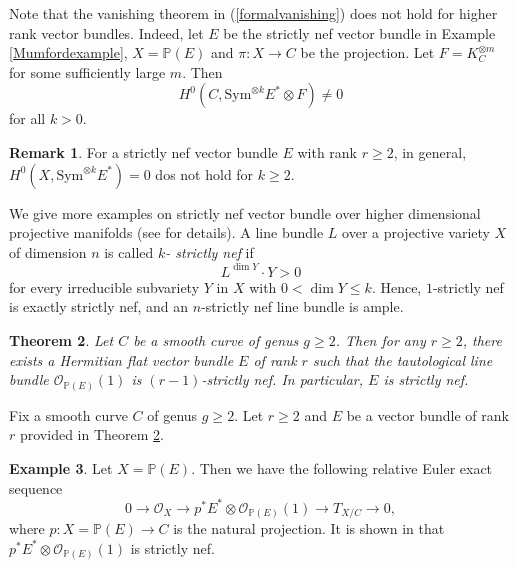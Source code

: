 \documentclass[english,reqno]{amsart}
\newcommand\bbP{{\mathbb P}}
\newcommand\sO{{\mathscr O}}
\theoremstyle{plain}
\newtheorem{thm}{Theorem}[section]
\theoremstyle{definition}
\newtheorem{example}[thm]{Example}
\newtheorem{remark}[thm]{Remark}
\numberwithin{equation}{section} %
\begin{document}
\noindent Note that the  vanishing theorem in (\ref{formalvanishing}) does not hold for higher rank vector bundles. Indeed, let $E$ be the strictly nef vector bundle in Example \ref{Mumfordexample}, $X=\bbP(E)$ and $\pi:X\rightarrow C$ be the projection. Let $ F=K^{\otimes m}_C$ for some sufficiently large $m$. Then
$$H^0(C, \mathrm{Sym}^{\otimes k}E^*\otimes F)\neq 0$$
for all $k>0$.

\begin{remark} For a strictly nef vector bundle $E$ with rank $r\geqslant  2$, in general,  $H^0(X,\mathrm{Sym}^{\otimes k} E^*)=0$ dos not hold for $k\geqslant  2$.

\end{remark}



We give more examples on strictly nef vector bundle over higher
dimensional projective manifolds (see
\cite[Section~5]{LiuOuYang2020} for details). A line bundle $L$ over
a projective variety $X$ of dimension $n$ is called \emph{$k$-
strictly nef} if
$$L^{\dim Y}\cdot Y>0$$
for every irreducible subvariety $Y$ in $X$ with $0<\dim Y\leq k$.
Hence, $1$-strictly nef is exactly strictly nef, and an $n$-strictly
nef line bundle is ample.
\begin{thm}\cite[Lemma 3.2 and Theorem 6.1]{Subramanian1989}\label{Subramanian}
    Let $C$ be a smooth curve of genus $g\geqslant 2$. Then for any $r\geqslant 2$, there exists a Hermitian flat vector bundle $E$ of rank $r$ such that the tautological line bundle $\sO_{\bbP(E)}(1)$ is $(r-1)$-strictly nef. In particular, $E$ is strictly nef.
\end{thm}

\noindent  Fix  a smooth  curve $C$ of genus $g \geqslant 2$. Let  $r\geqslant 2$ and  $E$  be a vector bundle of rank $r$ provided in Theorem \ref{Subramanian}.

\begin{example}
    \label{example:subbundles}
    Let $X=\bbP(E)$. Then we have the following relative Euler exact sequence
    \[0\rightarrow \sO_X\rightarrow p^*E^*\otimes\sO_{\bbP(E)}(1)\rightarrow T_{X/C}\rightarrow 0,\]
    where $p\colon X=\bbP(E)\rightarrow C$ is the natural projection.
    It is shown in \cite[Example~5.9]{LiuOuYang2020} that $ p^*E^*\otimes \sO_{\bbP(E)}(1)$ is strictly nef.
\end{example}
\end{document}
